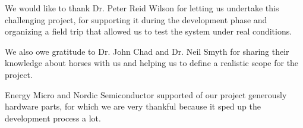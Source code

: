  We would like to thank Dr. Peter Reid Wilson for letting us undertake this challenging project, 
 for supporting it during the development phase and organizing a field trip that allowed us to test the system under real conditions.

We also owe gratitude to  Dr. John Chad and Dr. Neil Smyth for sharing their knowledge about horses with us and helping us to define a realistic scope for the project.

Energy Micro and Nordic Semiconductor supported of our project generously hardware parts, for which we are very thankful because it sped up the development process a lot.


